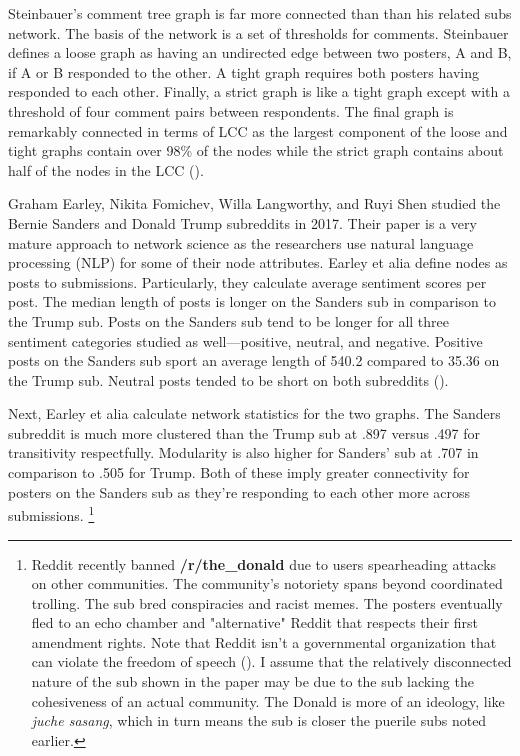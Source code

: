 \documentclass[12pt, a4paper]{article}
\begin{document}
Steinbauer's comment tree graph is far more connected than than his related subs network. The basis of the network is a set of thresholds for comments. Steinbauer defines a loose graph as having an undirected edge between two posters, A and B, if A or B responded to the other. A tight graph requires both posters having responded to each other. Finally, a strict graph is like a tight graph except with a threshold of four comment pairs between respondents. The final graph is remarkably connected in terms of LCC as the largest component of the loose and tight graphs contain over 98\% of the nodes while the strict graph contains about half of the nodes in the LCC (\cite{tbower_2011}).

Graham Earley, Nikita Fomichev, Willa Langworthy, and Ruyi Shen studied the Bernie Sanders and Donald Trump subreddits in 2017. Their paper is a very mature approach to network science as the researchers use natural language processing (NLP) for some of their node attributes. Earley et alia define nodes as posts to submissions. Particularly, they calculate average sentiment scores per post. The median length of posts is longer on the Sanders sub in comparison to the Trump sub. Posts on the Sanders sub tend to be longer for all three sentiment categories studied as well---positive, neutral, and negative. Positive posts on the Sanders sub sport an average length of 540.2 compared to 35.36 on the Trump sub. Neutral posts tended to be short on both subreddits (\cite{causeweb2017}).

Next, Earley et alia calculate network statistics for the two graphs. The Sanders subreddit is much more clustered than the Trump sub at .897 versus .497 for transitivity respectfully. Modularity is also higher for Sanders' sub at .707 in comparison to .505 for Trump. Both of these imply greater connectivity for posters on the Sanders sub as they're responding to each other more across submissions. \footnote{Reddit recently banned \textbf{/r/the\_donald} due to users spearheading attacks on other communities. The community's notoriety spans beyond coordinated trolling. The sub bred conspiracies and racist memes. The posters eventually fled to an echo chamber and "alternative" Reddit that respects their first amendment rights. Note that Reddit isn't a governmental organization that can violate the freedom of speech (\cite{thedonaldban2020}). I assume that the relatively disconnected nature of the sub shown in the paper may be due to the sub lacking the cohesiveness of an actual community. The Donald is more of an ideology, like \textit{juche sasang}, which in turn means the sub is closer the puerile subs noted earlier.}
\end{document}
